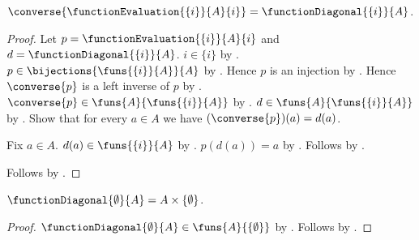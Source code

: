 \begin{theorem}\label{singleton_evaluation_converse}
    $\converse{\functionEvaluation{\{i\}}{A}{i}}=\functionDiagonal{\{i\}}{A}$.
\end{theorem}
\begin{proof}
    Let $p=\functionEvaluation{\{i\}}{A}{i}$ and $d=\functionDiagonal{\{i\}}{A}$.
    $i\in\{i\}$ by .
    $p\in\bijections{\funs{\{i\}}{A}}{A}$ by .
    Hence $p$ is an injection by .
    Hence $\converse{p}$ is a left inverse of $p$ by
        .
    $\converse{p}\in\funs{A}{\funs{\{i\}}{A}}$ by
        .
    $d\in\funs{A}{\funs{\{i\}}{A}}$ by .
    Show that for every $a\in A$ we have $(\converse{p})(a)=d(a)$.
    \begin{subproof}
        Fix $a\in A$.
        $d(a)\in\funs{\{i\}}{A}$ by .
        $p(d(a))=a$ by
            .
        Follows by .
    \end{subproof}
    Follows by .
\end{proof}

\begin{proposition}\label{function_diagonal_empty}
    $\functionDiagonal{\emptyset}{A}=A\times\{\emptyset\}$.
\end{proposition}
\begin{proof}
    $\functionDiagonal{\emptyset}{A}\in\funs{A}{\{\emptyset\}}$ by
        .
    Follows by .
\end{proof}
